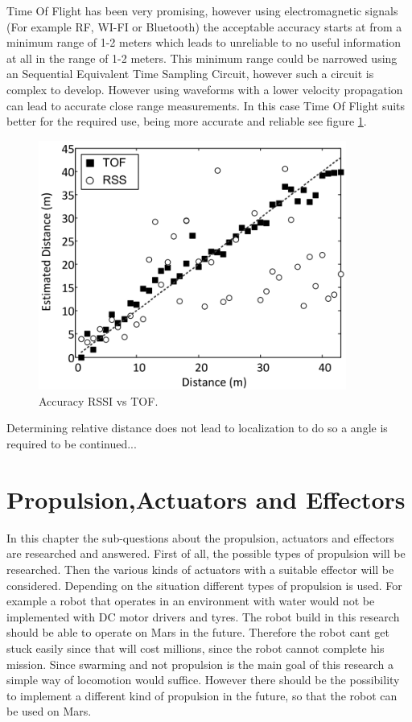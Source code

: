 \documentclass[10pt,a4paper]{article}
\begin{document}
Time Of Flight has been very promising, however using electromagnetic signals (For example RF, WI-FI or Bluetooth) the acceptable accuracy starts at from a minimum range of 1-2 meters which leads to unreliable to no useful information at all in the range of 1-2 meters. This minimum range could be narrowed using an Sequential Equivalent Time Sampling Circuit, however such a circuit is complex to develop. However using waveforms with a lower velocity propagation can lead to accurate close range measurements. In this case Time Of Flight suits better for the required use, being more accurate and reliable see figure \ref{RSSIvsTOF}.\cite{TOF}

\begin{figure}[H]
\centering
\includegraphics[width=0.9\textwidth]{RSSIvsTOF.pdf}
\caption{Accuracy RSSI vs TOF.\cite{TOF}} 
\label{RSSIvsTOF}
\end{figure}

Determining relative distance does not lead to localization to do so a angle is required to be continued... 
\newpage



\section{Propulsion,Actuators and Effectors}

In this chapter the sub-questions about the propulsion, actuators and effectors are researched and answered. First of all, the possible types of propulsion will be researched. Then the various kinds of actuators with a suitable effector will be considered. Depending on the situation different types of propulsion is used. For example a robot that operates in an environment with water would not be implemented with DC motor drivers and tyres. The robot build in this research should be able to operate on Mars in the future. Therefore the robot cant get stuck easily since that will cost millions, since the robot cannot complete his mission. Since swarming and not propulsion is the main goal of this research a simple way of locomotion would suffice. However there should be the possibility to implement a different kind of propulsion in the future, so that the robot can be used on Mars. 
\end{document}
